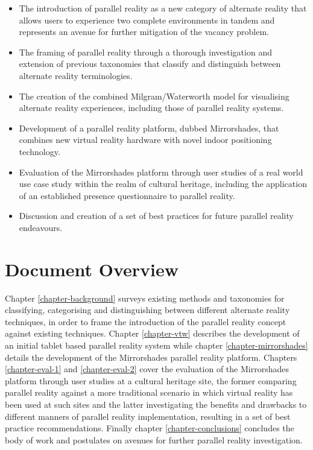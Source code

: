 \begin{itemize}
	\item The introduction of parallel reality as a new category of alternate reality that allows users to experience two complete environments in tandem and represents an avenue for further mitigation of the vacancy problem.
	\item The framing of parallel reality through a thorough investigation and extension of previous taxonomies that classify and distinguish between alternate reality terminologies.
	\item The creation of the combined Milgram/Waterworth model for visualising alternate reality experiences, including those of parallel reality systems.
	\item Development of a parallel reality platform, dubbed Mirrorshades, that combines new virtual reality hardware with novel indoor positioning technology.
	\item Evaluation of the Mirrorshades platform through user studies of a real world use case study within the realm of cultural heritage, including the application of an established presence questionnaire to parallel reality.
	\item Discussion and creation of a set of best practices for future parallel reality endeavours.
\end{itemize}


\section{Document Overview}

Chapter \ref{chapter-background} surveys existing methods and taxonomies for classifying, categorising and distinguishing between different alternate reality techniques, in order to frame the introduction of the parallel reality concept against existing techniques. Chapter \ref{chapter-vtw} describes the development of an initial tablet based parallel reality system while chapter \ref{chapter-mirrorshades} details the development of the Mirrorshades parallel reality platform. Chapters \ref{chapter-eval-1} and \ref{chapter-eval-2} cover the evaluation of the Mirrorshades platform through user studies at a cultural heritage site, the former comparing parallel reality against a more traditional scenario in which virtual reality has been used at such sites and the latter investigating the benefits and drawbacks to different manners of parallel reality implementation, resulting in a set of best practice recommendations. Finally chapter \ref{chapter-conclusions} concludes the body of work and postulates on avenues for further parallel reality investigation.

